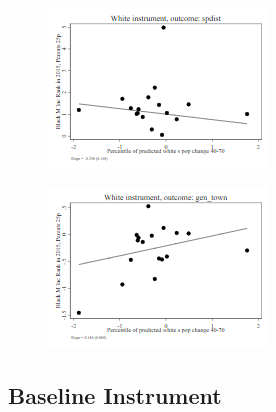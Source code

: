 \documentclass{article}
\begin{document}
\clearpage
\begin{figure}
	\centering
	\includegraphics[width=.8\textwidth]{figures/exogeneity_tests/D14_spdist.png}
\end{figure}
\clearpage
\clearpage
\begin{figure}
	\centering
	\includegraphics[width=.8\textwidth]{figures/exogeneity_tests/D14_gen_town.png}
\end{figure}
\clearpage

\subsection{Baseline Instrument}



\clearpage



\clearpage

\clearpage
\end{document}
